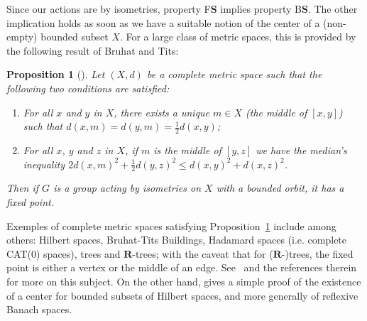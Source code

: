 \documentclass[a4paper]{article}
\newcommand{\PH}[1]{\todo[color={blue!33},size=small]{#1}}
\newtheorem{prop}[lem]{Proposition}
\theoremstyle{definition}
\newcommand*{\field}[1]{\mathbf{#1}}
\newcommand*{\R}{\field{R}}
\newcommand*{\BS}{B$\mathbf{S}$}
\begin{document}
Since our actions are by isometries, property F$\mathbf S$ implies property \BS. The other implication holds as soon as we have a suitable notion of the center of a (non-empty) bounded subset $X$.
For a large class of metric spaces, this is provided by the following result of Bruhat and Tits:
%
%
\begin{prop}[{\cite[Chapter 3.b]{MR1023471}}]\label{Proposition:Mediane}
Let $(X,d)$ be a complete metric space such that the following two conditions are satisfied:
\begin{enumerate}
\item For all $x$ and $y$ in $X$, there exists a unique $m\in X$ (the middle of $[x,y]$) such that $d(x,m)=d(y,m)=\frac12d(x,y)$;
\item For all $x$, $y$ and $z$ in $X$, if $m$ is the middle of $[y,z]$ we have the median's inequality  $2d(x,m)^2+\frac12d(y,z)^2\leq d(x,y)^2+d(x,z)^2$.
\end{enumerate}
Then if $G$ is a group acting by isometries on $X$ with a bounded orbit, it has a fixed point.
\end{prop}
%
%
Exemples of complete metric spaces satisfying Proposition~\ref{Proposition:Mediane} include among others: Hilbert spaces, Bruhat-Tits Buildings, Hadamard spaces (i.e. complete CAT(0) spaces), trees and $\R$-trees; with the caveat that for ($\R$-)trees, the fixed point is either a vertex or the middle of an edge.
See~\cite[Chapter 3.b]{MR1023471} and the references therein for more on this subject.
On the other hand, \cite[Lemma 2.2.7]{Bekka2008} gives a simple proof of the existence of a center for bounded subsets of Hilbert spaces, and more generally of reflexive Banach spaces.
\end{document}
